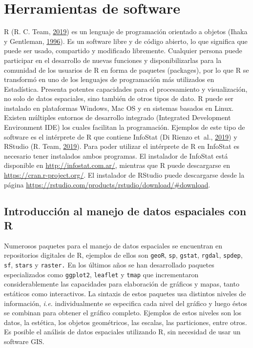 \documentclass[11pt,b5paper,]{krantz}
\begin{document}
\setcounter{chapter}{0}

\hypertarget{herramientas-de-software}{%
\chapter{Herramientas de software}\label{herramientas-de-software}}

R (R. C. Team, \protect\hyperlink{ref-R_Core_Team_2019}{2019}) es un lenguaje de programación orientado a objetos (Ihaka y Gentleman, \protect\hyperlink{ref-Ihaka_Gentleman_1996}{1996}). Es un software libre y de código abierto, lo que significa que puede ser usado, compartido y modificado libremente. Cualquier persona puede participar en el desarrollo de nuevas funciones y disponibilizarlas para la comunidad de los usuarios de R en forma de paquetes (packages), por lo que R se transformó en uno de los lenguajes de programación más utilizados en Estadística. Presenta potentes capacidades para el procesamiento y visualización, no solo de datos espaciales, sino también de otros tipos de dato. R puede ser instalado en plataformas Windows, Mac OS y en sistemas basados en Linux. Existen múltiples entornos de desarrollo integrado (Integrated Development Environment IDE) los cuales facilitan la programación. Ejemplos de este tipo de software es el intérprete de R que contiene InfoStat (Di Rienzo et~al., \protect\hyperlink{ref-Di_Rienzo_Casanoves_Balzarini_Gonzalez_Tablada_Robledo_2019}{2019}) y RStudio (R. Team, \protect\hyperlink{ref-RStudio_Team_2019}{2019}). Para poder utilizar el intérprete de R en InfoStat es necesario tener instalados ambos programas. El instalador de InfoStat está disponible en \url{http://infostat.com.ar/}, mientras que R puede descargarse en \url{https://cran.r-project.org/}. El instalador de RStudio puede descargarse desde la página \url{https://rstudio.com/products/rstudio/download/\#download}.

\hypertarget{introducciuxf3n-al-manejo-de-datos-espaciales-con-r}{%
\section{Introducción al manejo de datos espaciales con R}\label{introducciuxf3n-al-manejo-de-datos-espaciales-con-r}}

Numerosos paquetes para el manejo de datos espaciales se encuentran en repositorios digitales de R, ejemplos de ellos son \texttt{geoR}, \texttt{sp}, \texttt{gstat}, \texttt{rgdal}, \texttt{spdep}, \texttt{sf}, \texttt{stars} y \texttt{raster.} En los últimos años se han desarrollado paquetes especializados como \texttt{ggplot2}, \texttt{leaflet} y \texttt{tmap} que incrementaron considerablemente las capacidades para elaboración de gráficos y mapas, tanto estáticos como interactivos. La sintaxis de estos paquetes usa distintos niveles de información, \emph{i.e.} individualmente se especifica cada nivel del gráfico y luego éstos se combinan para obtener el gráfico completo. Ejemplos de estos niveles son los datos, la estética, los objetos geométricos, las escalas, las particiones, entre otros. Es posible el análisis de datos espaciales utilizando R, sin necesidad de usar un software GIS.
\end{document}
